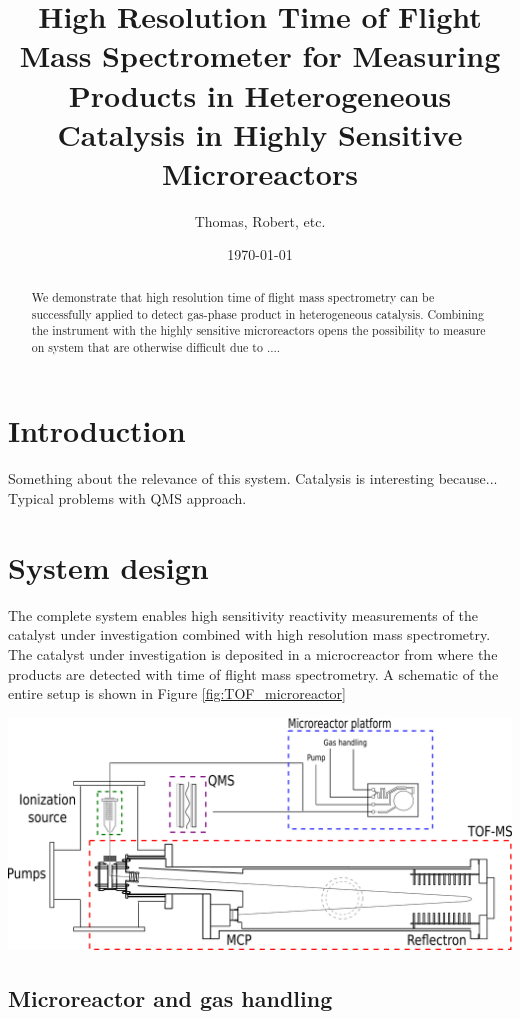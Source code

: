 \documentclass[12pt]{article}
\title{High Resolution Time of Flight Mass Spectrometer for Measuring Products in Heterogeneous Catalysis in Highly Sensitive Microreactors}
\author{Thomas, Robert, etc.}
\date{\today}
\begin{document}
\maketitle

\begin{abstract}
We demonstrate that high resolution time of flight mass spectrometry can be successfully applied to detect gas-phase product in heterogeneous catalysis. Combining the instrument with the highly sensitive microreactors opens the possibility to measure on system that are otherwise difficult due to ....
\end{abstract}

\section{Introduction}
Something about the relevance of this system. Catalysis is interesting because... Typical problems with QMS approach. 

\section{System design}
The complete system enables high sensitivity reactivity measurements of the catalyst under investigation combined with high resolution mass spectrometry. The catalyst under investigation is deposited in a microcreactor from where the products are detected with time of flight mass spectrometry. A schematic of the entire setup is shown in Figure \ref{fig:TOF_microreactor}
\begin{center}
	\includegraphics[scale=0.60]{TOF_microreactor.png}
	\label{fig:TOF_microreactor}
\end{center}

\subsection{Microreactor and gas handling}
\end{document}
